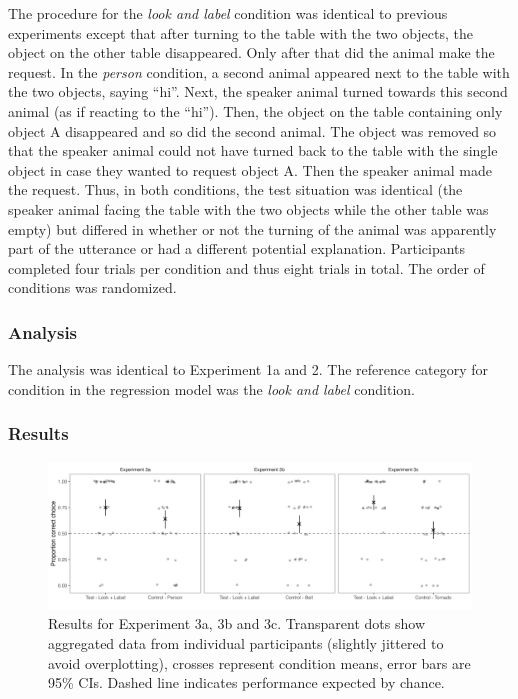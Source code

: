 \documentclass[
  man,floatsintext]{apa6}
\begin{document}
The procedure for the \emph{look and label} condition was identical to previous experiments except that after turning to the table with the two objects, the object on the other table disappeared. Only after that did the animal make the request. In the \emph{person} condition, a second animal appeared next to the table with the two objects, saying ``hi''. Next, the speaker animal turned towards this second animal (as if reacting to the ``hi''). Then, the object on the table containing only object A disappeared and so did the second animal. The object was removed so that the speaker animal could not have turned back to the table with the single object in case they wanted to request object A. Then the speaker animal made the request. Thus, in both conditions, the test situation was identical (the speaker animal facing the table with the two objects while the other table was empty) but differed in whether or not the turning of the animal was apparently part of the utterance or had a different potential explanation. Participants completed four trials per condition and thus eight trials in total. The order of conditions was randomized.

\hypertarget{analysis-3}{%
\subsubsection{Analysis}\label{analysis-3}}

The analysis was identical to Experiment 1a and 2. The reference category for condition in the regression model was the \emph{look and label} condition.

\hypertarget{results-3}{%
\subsubsection{Results}\label{results-3}}

\begin{figure}

{\centering \includegraphics[width=1\linewidth]{../figures/fig3} 

}

\caption{Results for Experiment 3a, 3b and 3c. Transparent dots show aggregated data from individual participants (slightly jittered to avoid overplotting), crosses represent condition means, error bars are 95\% CIs. Dashed line indicates performance expected by chance.}\label{fig:fig3}
\end{figure}
\end{document}
